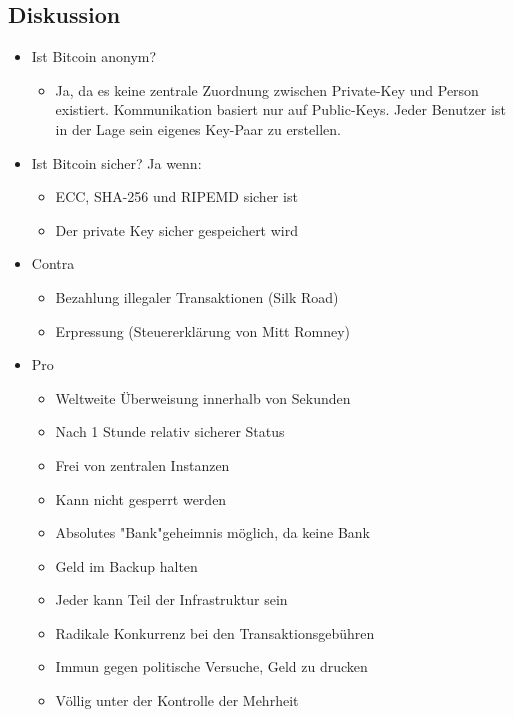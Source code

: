 \documentclass{article} %
\begin{document}
	\subsection{Diskussion}
			\begin{itemize}
			\item Ist Bitcoin anonym?
			\begin{itemize}
				\item Ja, da es keine zentrale Zuordnung zwischen Private-Key und Person existiert. Kommunikation basiert nur auf Public-Keys. Jeder Benutzer ist in der Lage sein eigenes Key-Paar zu erstellen.
			\end{itemize}
			\item Ist Bitcoin sicher? Ja wenn:
			\begin{itemize}
				\item ECC, SHA-256 und RIPEMD sicher ist
				\item Der private Key sicher gespeichert wird
			\end{itemize}
			\item Contra
				\begin{itemize}
				 \item Bezahlung illegaler Transaktionen (Silk Road)
				 \item Erpressung (Steuererklärung von Mitt Romney)
				\end{itemize}
			\item Pro
				\begin{itemize}
				 \item Weltweite Überweisung innerhalb von Sekunden
				 \item Nach 1 Stunde relativ sicherer Status
				 \item Frei von zentralen Instanzen
				 \item Kann nicht gesperrt werden
				 \item Absolutes "Bank"geheimnis möglich, da keine Bank
				 \item Geld im Backup halten
				 \item Jeder kann Teil der Infrastruktur sein
				 \item Radikale Konkurrenz bei den Transaktionsgebühren
				 \item Immun gegen politische Versuche, Geld zu drucken
				 \item Völlig unter der Kontrolle der Mehrheit
				\end{itemize}
		\end{itemize}
\end{document}
